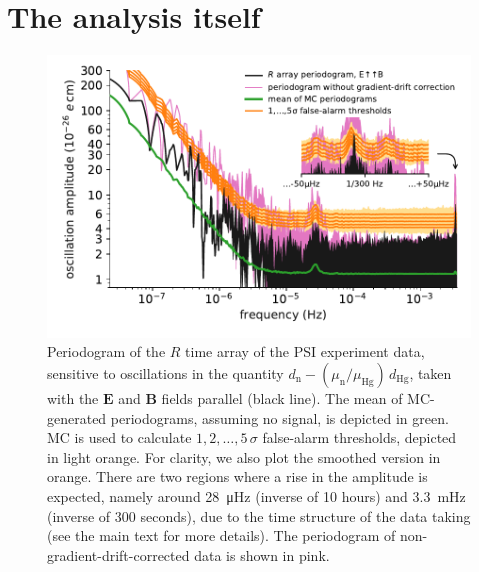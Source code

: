 






\section{The analysis itself}
\begin{figure}
  \centering
  \includegraphics[width=\linewidth]{gfx/axions/detection_psi_inset_gc.pdf}
  \caption{Periodogram of the $R$ time array of the PSI experiment data, sensitive to oscillations in the quantity $d_\mathrm{n} - \left( \mu_\mathrm{n} / \mu_\mathrm{Hg} \right) \, d_\mathrm{Hg}$, taken with the $\boldsymbol{E}$ and $\boldsymbol{B}$ fields parallel (black line).
  The mean of MC-generated periodograms, assuming no signal, is depicted in green. MC is used to calculate $1,2,…,5\,\sigma$ false-alarm thresholds, depicted in light orange.
  For clarity, we also plot the smoothed version in orange.
  There are two regions where a rise in the amplitude is expected, namely around \SI{28}{\micro\hertz} (inverse of 10 hours) and \SI{3.3}{\milli\hertz} (inverse of 300 seconds), due to the time structure of the data taking (see the main text for more details). The periodogram of non-gradient-drift-corrected data is shown in pink.}\label{fig:axions_PSI_detection}
\end{figure}

